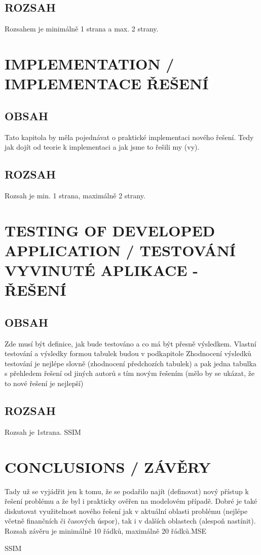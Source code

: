 \documentclass[journal]{IEEEtran}
\begin{document}
\subsection{ROZSAH}
Rozsahem je minimálně 1 strana a max. 2 strany.




\section{IMPLEMENTATION / IMPLEMENTACE ŘEŠENÍ}
\subsection{OBSAH}
Tato kapitola by měla pojednávat o praktické implementaci nového řešení. Tedy jak dojít od teorie k implementaci a jak jsme to řešili my (vy).
\subsection{ROZSAH}
Rozsah je min. 1 strana, maximálně 2 strany.





\section{TESTING OF DEVELOPED APPLICATION / TESTOVÁNÍ VYVINUTÉ APLIKACE - ŘEŠENÍ}
\subsection{OBSAH}
Zde musí být definice, jak bude testováno a co má být přesně výsledkem.
Vlastní testování a výsledky formou tabulek budou v podkapitole
Zhodnocení výsledků testování je nejlépe slovně (zhodnocení předchozích tabulek) a pak jedna tabulka s přehledem řešení od jiných autorů s tím novým řešením (mělo by se ukázat, že to nové řešení je nejlepší)
\subsection{ROZSAH}
Rozsah je 1strana. \ac{SSIM}



\section{CONCLUSIONS / ZÁVĚRY}
Tady už se vyjádřit jen k tomu, že se podařilo najít (definovat) nový přístup k řešení problému a že byl i prakticky ověřen na modelovém případě. 
Dobré je také diskutovat využitelnost nového řešení jak v aktuální oblasti problému (nejlépe včetně finančních či časových úspor), tak i v dalších oblastech (alespoň nastínit).
Rozsah závěru je minimálně 10 řádků, maximálně 20 řádků.\ac{MSE}\cite{einstein}

\ac{SSIM}


\printbibliography

\printacronyms


\end{document}
